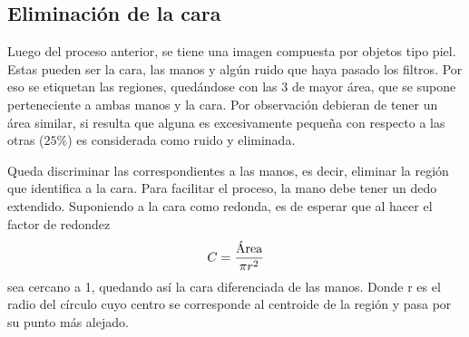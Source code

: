 \documentclass[portrait,a0paper,fontscale=0.277]{baposter}
\begin{document}
\begin{poster}
{		\section{Eliminación de la cara}

			Luego del proceso anterior, se tiene una imagen compuesta por  objetos  tipo
			piel. Estas pueden ser la cara, las manos y algún ruido que haya pasado  los
			filtros. Por eso se etiquetan las  regiones, quedándose con las 3  de  mayor
			área, que se supone perteneciente a ambas manos y la cara.  Por  observación
			debieran de tener un área similar, si resulta que  alguna  es  excesivamente
			pequeña con respecto a  las  otras  ($25 \%$)  es  considerada  como  ruido  y
			eliminada.

			Queda discriminar las correspondientes a las manos, es decir, eliminar la
			región que identifica a la cara. Para facilitar el proceso, la mano debe
			tener un dedo extendido. Suponiendo a la cara como redonda, es de esperar
			que al hacer el factor de  redondez
			\[ C = \frac{\makebox{Área}}{\pi r^2}\]
			sea cercano a 1, quedando así la cara diferenciada de las manos. Donde r  es
			el radio del círculo cuyo centro se corresponde al centroide de la región  y
			pasa por su punto más alejado.

	}




\end{poster}
\end{document}
